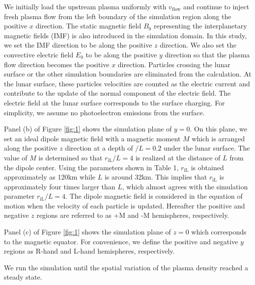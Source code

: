 \documentclass[draft,jgrga]{agutex2015}
\begin{document}
\begin{article}
We initially load the upstream plasma uniformly with $v_\mathrm{flow}$
and continue to inject fresh plasma flow from the left boundary of 
the simulation region along the positive $x$ direction.
The static magnetic field $B_0$ representing the interplanetary magnetic fields (IMF) 
is also introduced in the simulation domain. 
In this study, we set the IMF direction to be along the positive $z$ direction.
We also set the convective electric field $E_0$  
to be along the positive $y$ direction so that 
the plasma flow direction becomes the positive $x$ direction. 
Particles crossing the lunar surface or the other simulation boundaries are 
eliminated from the calculation. 
At the lunar surface, these particles velocities are counted as 
the electric current and contribute to the update of the normal component
of the electric field. 
The electric field at the lunar surface corresponds to the surface charging.
For simplicity, we assume no photoelectron emissions from the surface. 

Panel (b) of Figure \ref{fig:1} shows the simulation plane of $y=0$.
On this plane, we set an ideal dipole magnetic field with 
a magnetic moment $M$ which is arranged along the positive $z$ direction
at a depth of $/L = 0.2$ under the lunar surface.
The value of $M$ is determined so that $r_\mathrm{iL}/L =4$ is realized
at the distance of $L$ from the dipole center.
Using the parameters shown in Table 1,
$r_\mathrm{iL}$ is obtained approximately as 120km while $L$ is around 32km.
This implies that 
$r_\mathrm{iL}$ is approximately four times larger than $L$,
which almost agrees with the simulation parameter $r_\mathrm{iL}/L =4$.
The dipole magnetic field is considered in the equation of motion 
when the velocity of each particle is updated. 
Hereafter the positive and negative $z$ regions are referred to as 
+M and -M hemispheres, respectively.

Panel (c) of Figure \ref{fig:1} shows the simulation plane of $z=0$
which corresponds to the magnetic equator.
For convenience, 
we define the positive and negative $y$ regions as R-hand and L-hand 
hemispheres, respectively.

We run the simulation until the spatial variation of the plasma density reached a steady state. 
%




\end{article}
\end{document}
